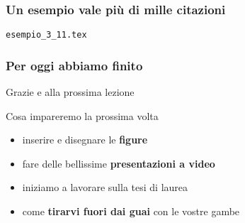 \begin{frame}
\begin{columns}
		\begin{LaTeXoutput}
			\\
			\\
			\\	
			\\
			\\
			\\
			\\
			\\
			\\
			\\
		\end{LaTeXoutput}
	\end{columns}
\end{frame}
\begin{frame}
  \frametitle{Un esempio vale pi\`u di mille citazioni}
	\begin{center}
		\alert{\texttt{esempio\_3\_11.tex}}
	\end{center}
\end{frame}
\begin{frame}
  \frametitle{Per oggi abbiamo finito}
	\begin{center}
		\huge
		Grazie e alla prossima lezione
	\end{center}
  \medskip
	\begin{block}{Cosa impareremo la prossima volta}
		\begin{itemize}
			\item inserire e disegnare le \textbf{figure}
			\item fare delle bellissime \textbf{presentazioni a video}
			\item iniziamo a lavorare sulla tesi di laurea 
			\item come \textbf{tirarvi fuori dai guai} con le vostre gambe
		\end{itemize}
	\end{block}
\end{frame}
